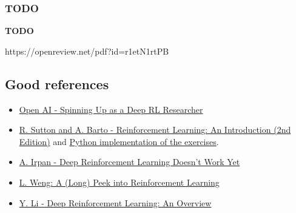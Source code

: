 \documentclass[12pt, english]{article}
\begin{document}
\subsubsection{TODO}


\textbf{TODO}

https://openreview.net/pdf?id=r1etN1rtPB


\subsection{Good references}

\begin{itemize}
  \item \href{https://spinningup.openai.com/en/latest/spinningup/spinningup.html}{Open AI - Spinning Up as a Deep RL Researcher}
  \item \href{http://incompleteideas.net/book/the-book-2nd.html}{R. Sutton and A. Barto - Reinforcement Learning: An Introduction (2nd Edition)} and \href{https://github.com/ShangtongZhang/reinforcement-learning-an-introduction}{Python implementation of the exercises}.
  \item \href{https://www.alexirpan.com/2018/02/14/rl-hard.html}{A. Irpan - Deep Reinforcement Learning Doesn't Work Yet}
  \item \href{https://lilianweng.github.io/lil-log/2018/02/19/a-long-peek-into-reinforcement-learning.html}{L. Weng: A (Long) Peek into Reinforcement Learning}
  \item \href{http://arxiv.org/abs/1701.07274}{Y. Li - Deep Reinforcement Learning: An Overview}
\end{itemize}







\end{document}
